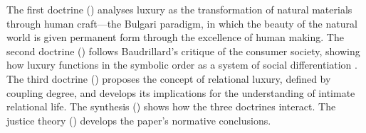  The first doctrine () analyses luxury as the transformation of natural materials through human craft---the Bulgari paradigm, in which the beauty of the natural world is given permanent form through the excellence of human making. The second doctrine () follows Baudrillard's critique of the consumer society, showing how luxury functions in the symbolic order as a system of social differentiation \parencite{baudrillard1981,baudrillard1998}. The third doctrine () proposes the concept of relational luxury, defined by coupling degree, and develops its implications for the understanding of intimate relational life. The synthesis () shows how the three doctrines interact. The justice theory () develops the paper's normative conclusions.

